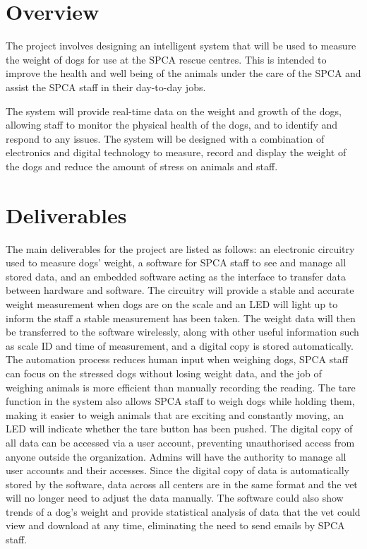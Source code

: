 
\chapter{Overview}
The project involves designing an intelligent system that will be used to measure the weight of dogs for use at the SPCA rescue centres. This is intended to improve the health and well being of the animals under the care of the SPCA and assist the SPCA staff in their day-to-day jobs.

The system will provide real-time data on the weight and growth of the dogs, allowing staff to monitor the physical health of the dogs, and to identify and respond to any issues. The system will be designed with a combination of electronics and digital technology to measure, record and display the weight of the dogs and reduce the amount of stress on animals and staff. 

\chapter{Deliverables}

The main deliverables for the project are listed as follows: an electronic circuitry used to measure dogs' weight, a software for SPCA staff to see and manage all stored data, and an embedded software acting as the interface to transfer data between hardware and software. The circuitry will provide a stable and accurate weight measurement when dogs are on the scale and an LED will light up to inform the staff a stable measurement has been taken. The weight data will then be transferred to the software wirelessly, along with other useful information such as scale ID and time of measurement, and a digital copy is stored automatically. The automation process reduces human input when weighing dogs, SPCA staff can focus on the stressed dogs without losing weight data, and the job of weighing animals is more efficient than manually recording the reading. The tare function in the system also allows SPCA staff to weigh dogs while holding them, making it easier to weigh animals that are exciting and constantly moving, an LED will indicate whether the tare button has been pushed. The digital copy of all data can be accessed via a user account, preventing unauthorised access from anyone outside the organization. Admins will have the authority to manage all user accounts and their accesses. Since the digital copy of data is automatically stored by the software, data across all centers are in the same format and the vet will no longer need to adjust the data manually. The software could also show trends of a dog's weight and provide statistical analysis of data that the vet could view and download at any time, eliminating the need to send emails by SPCA staff.



